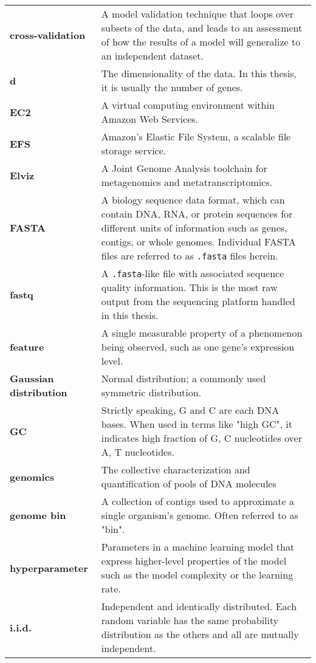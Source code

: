\begin{singlespace}
\begin{longtable}{ p{}  p{} }
\textbf{cross-validation} &  A model validation technique that loops over subsets of the data, and leads to an assessment of how the results of a model will generalize to an independent dataset.  \\
\textbf{d} & The dimensionality of the data.  In this thesis, it is usually the number of genes. \\
\textbf{EC2} & A virtual computing environment within Amazon Web Services. \\
\textbf{EFS} & Amazon's Elastic File System, a scalable file storage service.  \\
\textbf{Elviz} & A Joint Genome Analysis toolchain for metagenomics and metatranscriptomics.  \\
\textbf{FASTA} &  A biology sequence data format, which can contain DNA, RNA, or protein sequences for different units of information such as genes, contigs, or whole genomes.  Individual FASTA files are referred to as \texttt{.fasta} files herein.  \\
\textbf{fastq} & A \texttt{.fasta}-like file with associated sequence quality information.  This is the most raw output from the sequencing platform handled in this thesis. \\
\textbf{feature} & A single measurable property of a phenomenon being observed, such as one gene's expression level. \\
\textbf{Gaussian distribution} & Normal distribution; a commonly used symmetric distribution. \\
\textbf{GC} & Strictly speaking, G and C are each DNA bases.
	When used in terms like "high GC", it indicates high fraction of G, C nucleotides over A, T nucleotides. \\
\textbf{genomics} & The collective characterization and quantification of pools of DNA molecules \\
\textbf{genome bin} & A collection of contigs used to approximate a single organism's genome.  Often referred to as "bin". \\
\textbf{hyperparameter} & Parameters in a machine learning model that express higher-level properties of the model such as the model complexity or the learning rate. \\
\textbf{i.i.d.} & Independent and identically distributed.
    Each random variable has the same probability distribution as the others and all are mutually independent. \\

\end{longtable}
\end{singlespace}
